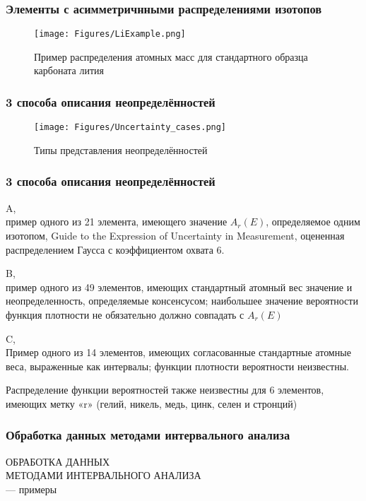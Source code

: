 \begin{frame}
		\frametitle{Элементы с асимметричнными распределениями изотопов }
\begin{figure}[ht] 
	\centering\small
	\unitlength=1mm
	\texttt{[image: Figures/LiExample.png]}
	\caption{Пример распределения атомных масс для стандартного образца карбоната лития} 
	\label{f:LiExample}
\end{figure}
\end{frame}

\begin{frame}
	\frametitle{3 способа описания неопределённостей   }
	\begin{figure}[ht] 
		\centering\small
		\unitlength=1mm
		\texttt{[image: Figures/Uncertainty\_cases.png]}
		\caption{Типы представления неопределённостей} 
		\label{f:Uncertainty cases}
	\end{figure}
\end{frame}

\begin{frame}
	\frametitle{3 способа описания неопределённостей   }
A,\\ пример одного из 21 элемента, имеющего значение $A_r (E)$, определяемое одним
изотопом, Guide to the Expression of Uncertainty in
Measurement, оцененная распределением Гаусса с коэффициентом охвата 6.

B, \\пример одного из 49 элементов, имеющих стандартный атомный вес
значение и неопределенность, определяемые
консенсусом; наибольшее значение вероятности
функция плотности не обязательно должно совпадать с $A_r (E)$

C,\\
Пример одного из 14 элементов, имеющих
согласованные стандартные атомные веса, выраженные как
интервалы; функции плотности вероятности неизвестны. 

Распределение функции вероятностей
также неизвестны для 6 элементов, имеющих
метку «r» (гелий, никель, медь, цинк, селен и стронций)


\end{frame}

\begin{frame}
\frametitle{Обработка данных методами интервального анализа}


\begin{center}	
ОБРАБОТКА ДАННЫХ \\
МЕТОДАМИ ИНТЕРВАЛЬНОГО АНАЛИЗА \\
--- примеры
\end{center}

\end{frame}


